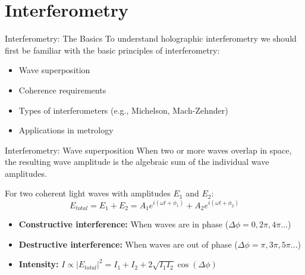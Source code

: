 \documentclass{beamer}
\begin{document}
\section{Interferometry}
\begin{frame}{Interferometry: The Basics}
    To understand holographic interferometry we should first be familiar with the basic principles of interferometry:
    \begin{itemize}
        \item Wave superposition
        \item Coherence requirements
        \item Types of interferometers (e.g., Michelson, Mach-Zehnder)
        \item Applications in metrology
    \end{itemize}
\end{frame}
\begin{frame}{Interferometry: Wave superposition}
    When two or more waves overlap in space, the resulting wave amplitude is the algebraic sum of the individual wave amplitudes.
    
    \vspace{0.5em}
    
    For two coherent light waves with amplitudes $E_1$ and $E_2$:
    \begin{equation}
        E_{total} = E_1 + E_2 = A_1 e^{i(\omega t + \phi_1)} + A_2 e^{i(\omega t + \phi_2)}
    \end{equation}
    
    \begin{itemize}
        \item \textbf{Constructive interference:} When waves are in phase ($\Delta\phi = 0, 2\pi, 4\pi...$)
        \item \textbf{Destructive interference:} When waves are out of phase ($\Delta\phi = \pi, 3\pi, 5\pi...$)
        \item \textbf{Intensity:} $I \propto |E_{total}|^2 = I_1 + I_2 + 2\sqrt{I_1 I_2}\cos(\Delta\phi)$
    \end{itemize}
\end{frame}
\end{document}
